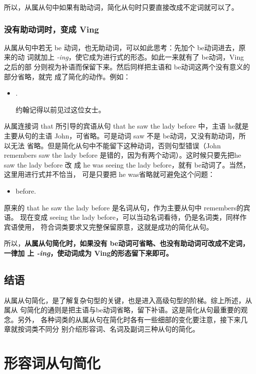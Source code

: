 所以，从属从句中如果有助动词，简化从句时只要直接改成不定词就可以了。

\subsection{没有助动词时，变成 Ving}

从属从句中若无 be 动词，也无助动词，可以如此思考：先加个 be动词进去，原来的动
词就加上 \emph{-ing}，使它成为进行式的形态。如此一来就有了 be动词，Ving 之后的部
分则视为补语而保留下来。然后同样把主语和 be动词这两个没有意义的部分省略，就完
成了简化的动作。例如：
\begin{itemize}
\item {}   .

  约翰记得以前见过这位女士。
\end{itemize}

从属连接词 that 所引导的宾语从句 that he saw the lady before 中，主语 he就是
主要从句的主语 John，可省略。可是动词 saw 不是 be动词，又没有助动词，所以无法
省略。但是简化从句中不能留下这种动词，否则句型错误（John remembers saw the
lady before 是错的，因为有两个动词）。这时候只要先把he saw the lady before 改
成 he was seeing the lady before，就有 be动词了。当然，这里用进行式并不恰当，
可是只要把 he was省略就可避免这个问题：
\begin{itemize}
\item {}   before.
\end{itemize}
原来的 that he saw the lady before 是名词从句，作为主要从句中 remembers的宾语。
现在变成 seeing the lady before，可以当动名词看待，仍是名词类，同样作宾语使用，
符合词类要求又完整保留原意，这就是成功的简化从句。

所以，\textbf{从属从句简化时，如果没有 be动词可省略、也没有助动词可改成不定词，一律加
上 \emph{-ing}，使动词成为 Ving的形态留下来即可。}

\section{结语}

从属从句简化，是了解复杂句型的关键，也是进入高级句型的阶梯。综上所述，从属从
句简化的通则是把主语与be动词省略，留下补语。这是简化从句最重要的观念。另外，
各种词类的从属从句在简化时各有一些细部的变化要注意，接下来几章就按词类不同分
别介绍形容词、名词及副词三种从句的简化。

\chapter{形容词从句简化}


